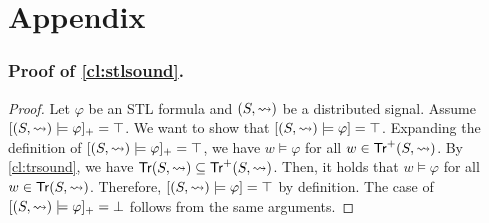 \section*{Appendix}
\subsubsection{Proof of \cref{cl:stlsound}.}
\begin{proof}
	Let $\varphi$ be an STL formula and $(S,{\rightsquigarrow})$ be a distributed signal.
	Assume $[(S,{\rightsquigarrow}) \models \varphi]_+ = \top$.
	We want to show that $[(S,{\rightsquigarrow}) \models \varphi] = \top$.
	Expanding the definition of $[(S,{\rightsquigarrow}) \models \varphi]_+ = \top$, we have $w \models \varphi$ for all $w \in \mathsf{Tr}^+(S,{\rightsquigarrow})$.
	By \cref{cl:trsound}, we have $\mathsf{Tr}(S,{\rightsquigarrow}) \subseteq \mathsf{Tr}^+(S,{\rightsquigarrow})$.
	Then, it holds that $w \models \varphi$ for all $w \in \mathsf{Tr}(S,{\rightsquigarrow})$.
	Therefore, $[(S,{\rightsquigarrow}) \models \varphi] = \top$ by definition.
	The case of $[(S,{\rightsquigarrow}) \models \varphi]_+ = \bot$ follows from the same arguments.
%	
\end{proof}

